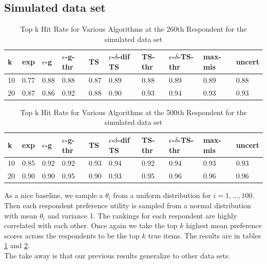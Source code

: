 \documentclass[a4paper,12pt]{article}
\newcommand{\fixedexpressS}{\textbf{exp}}
\newcommand{\egreedyS}{$\epsilon$-\textbf{g}}
\newcommand{\egreedythresS}{$\epsilon$-\textbf{g-thr}}
\newcommand{\misminS}{\textbf{max-mis}}
\newcommand{\tsS}{\textbf{TS} }
\newcommand{\edtsS}{$\epsilon$-$\delta$-\textbf{dif TS} }
\newcommand{\tsthresS}{\textbf{TS-thr} }
\newcommand{\edtsthresS}{$\epsilon$-$\delta$-\textbf{TS-thr} }
\newcommand{\uncertS}{\textbf{uncert} }
\begin{document}
\subsection{Simulated data set}
\begin{table}
\begin{center}
\begin{tabular}{llllllllll}
\hline   k &  \fixedexpressS & \egreedyS&\egreedythresS&\tsS&\edtsS&\tsthresS&\edtsthresS& \misminS& \uncertS \\\hline  10 & 0.77 &   0.88 & 0.88  & 0.87&0.89 & 	0.88&0.89 & 0.89 &  0.88 \\  20 &  0.87 &  0.86 &   0.92  & 0.88&0.90 &  	0.93&0.94&  0.93 &  0.93 \end{tabular}
\end{center}
\caption{Top k Hit Rate for Various Algorithms at the 260th Respondent for the simulated data set}
\label{table:nice260}
\end{table}
\begin{table}
\begin{center}
\begin{tabular}{llllllllll}
\hline   k &  \fixedexpressS & \egreedyS&\egreedythresS&\tsS&\edtsS&\tsthresS&\edtsthresS& \misminS& \uncertS  \\\hline    10 & 0.85&0.92&0.92 & 0.93&0.94 & 0.92&0.94&0.93 &   0.93 \\  20 & 0.90&0.90&0.95& 0.90 &0.93 & 0.95&0.96 &0.96& 0.96 
\end{tabular}
\end{center}
\caption{Top k Hit Rate for Various Algorithms at the 500th Respondent for the simulated data set}
\label{table:nice500}
\end{table}

As a nice baseline, we sample a $\theta_i$ from a uniform distribution for $i=1,\ldots,100$. Then each respondent preference utility is sampled from a normal distribution with mean $\theta_i$ and variance 1. The rankings for each respondent are highly correlated with each other. Once again we take the top $k$ highest mean preference scores across the respondents to be the top $k$ true items. The results are in tables \ref{table:nice260} and \ref{table:nice500}.\\ The take away is that our previous results generalize to other data sets.
\end{document}

